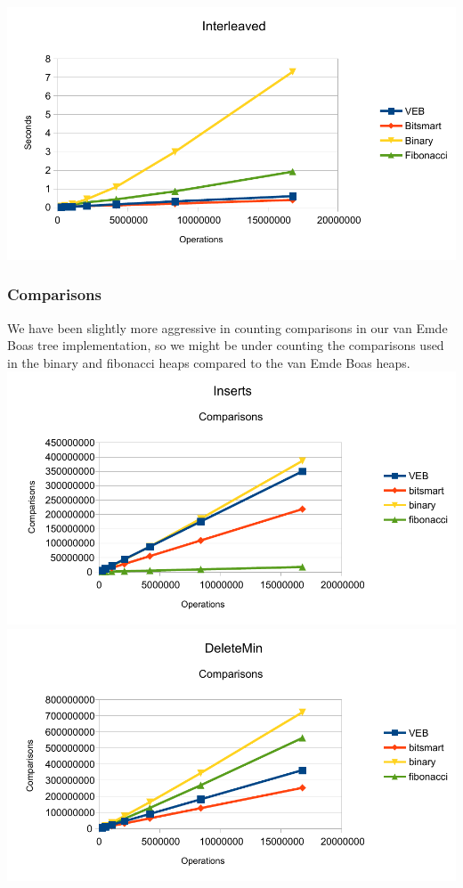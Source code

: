 \includegraphics[width=\textwidth]{graphs/Interleaved.pdf}

\subsubsection{Comparisons}
We have been slightly more aggressive in counting comparisons in our van Emde Boas tree implementation, so we might be under counting the comparisons used in the binary and fibonacci heaps compared to the van Emde Boas heaps.
\includegraphics[width=\textwidth]{graphs/Inserts_comparisons.pdf}
\includegraphics[width=\textwidth]{graphs/DeleteMin_comparisons.pdf}
